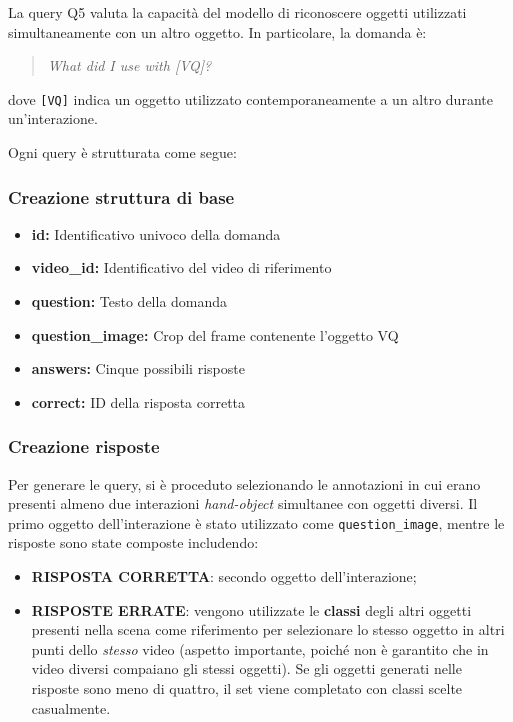 La query Q5 valuta la capacità del modello di riconoscere oggetti utilizzati simultaneamente con un altro oggetto. In particolare, la domanda è:

\begin{quote}
\textit{What did I use with [VQ]?}
\end{quote}

dove \texttt{[VQ]} indica un oggetto utilizzato contemporaneamente a un altro durante un'interazione.

Ogni query è strutturata come segue:

\subsubsection*{Creazione struttura di base}
\begin{itemize}
    \item \textbf{id:} Identificativo univoco della domanda
    \item \textbf{video\_id:} Identificativo del video di riferimento
    \item \textbf{question:} Testo della domanda
    \item \textbf{question\_image:} Crop del frame contenente l'oggetto VQ
    \item \textbf{answers:} Cinque possibili risposte
    \item \textbf{correct:} ID della risposta corretta
\end{itemize}

\subsubsection*{Creazione risposte}
Per generare le query, si è proceduto selezionando le annotazioni in cui erano presenti almeno due interazioni \emph{hand-object} simultanee con oggetti diversi. Il primo oggetto dell'interazione è stato utilizzato come \texttt{question\_image}, mentre le risposte sono state composte includendo:

\begin{itemize}
    \item \textbf{RISPOSTA CORRETTA}: secondo oggetto dell'interazione;
    \item \textbf{RISPOSTE ERRATE}: vengono utilizzate le \textbf{classi} degli altri oggetti presenti nella scena come riferimento per selezionare lo stesso oggetto in altri punti dello \emph{stesso} video (aspetto importante, poiché non è garantito che in video diversi compaiano gli stessi oggetti). Se gli oggetti generati nelle risposte sono meno di quattro, il set viene completato con classi scelte casualmente.
\end{itemize}

